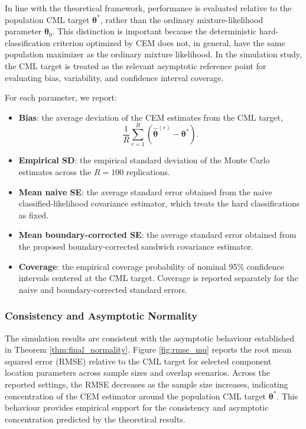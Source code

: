 \documentclass[pdflatex,sn-mathphys-ay]{sn-jnl}%
\let\oldtheta\theta
\renewcommand{\theta}{\boldsymbol{\oldtheta}}
\theoremstyle{thmstyleone}%
\theoremstyle{thmstyletwo}%
\theoremstyle{thmstylethree}%
\begin{document}
In line with the theoretical framework, performance is evaluated relative to the population CML target $ \boldsymbol{\theta}^*$, rather than the ordinary mixture-likelihood parameter $ \boldsymbol{\theta}_0$. This distinction is important because the deterministic hard-classification criterion optimized by CEM does not, in general, have the same population maximizer as the ordinary mixture likelihood. In the simulation study, the CML target is treated as the relevant asymptotic reference point for evaluating bias, variability, and confidence interval coverage.

For each parameter, we report:
\begin{itemize}
    \item \textbf{Bias}: the average deviation of the CEM estimates from the CML target,
    \[
        \frac{1}{R}
        \sum_{r=1}^R
        \left(
            \widehat{\theta}^{(r)}
            -
           \boldsymbol{\theta}^*
        \right).
    \]

    \item \textbf{Empirical SD}: the empirical standard deviation of the Monte Carlo estimates across the $R=100$ replications.

    \item \textbf{Mean naive SE}: the average standard error obtained from the naive classified-likelihood covariance estimator, which treats the hard classifications as fixed.

    \item \textbf{Mean boundary-corrected SE}: the average standard error obtained from the proposed boundary-corrected sandwich covariance estimator.

    \item \textbf{Coverage}: the empirical coverage probability of nominal 95\% confidence intervals centered at the CML target. Coverage is reported separately for the naive and boundary-corrected standard errors.
\end{itemize}

\subsubsection{Consistency and Asymptotic Normality}

The simulation results are consistent with the asymptotic behaviour established in Theorem \ref{thm:final_normality}. Figure \ref{fig:rmse_mu} reports the root mean squared error (RMSE) relative to the CML target for selected component location parameters across sample sizes and overlap scenarios. Across the reported settings, the RMSE decreases as the sample size increases, indicating concentration of the CEM estimator around the population CML target $\boldsymbol{\theta}^*$. This behaviour provides empirical support for the consistency and asymptotic concentration predicted by the theoretical results.
\end{document}
